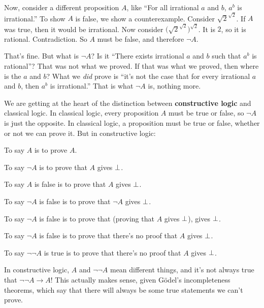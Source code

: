\documentclass[11pt,paper=letter]{scrartcl}
\renewcommand{\lnot}{\neg}
\begin{document}
Now, consider a different proposition $A$, like ``For all irrational $a$ and $b$, $a^b$ is irrational.'' To show $A$ is false, we show a counterexample. Consider $\sqrt{2}^{\sqrt{2}}$. If $A$ was true, then it would be irrational. Now consider $\Big(\sqrt{2}^{\sqrt{2}}\Big)^{\sqrt{2}}$. It is $2$, so it is rational. Contradiction. So $A$ must be false, and therefore $\lnot A$.

That's fine. But what is $\lnot A$? Is it ``There exists irrational $a$ and $b$ such that $a^b$ is rational''? That was not what we proved. If that was what we proved, then where is the $a$ and $b$? What we \emph{did} prove is ``it's not the case that for every irrational $a$ and $b$, then $a^b$ is irrational.'' That is what $\lnot A$ is, nothing more.



We are getting at the heart of the distinction between \textbf{constructive logic} and classical logic. In classical logic, every proposition $A$ must be true or false, so $\lnot A$ is just the opposite. In classical logic, a proposition must be true or false, whether or not we can prove it. But in constructive logic:
\begin{itemthin}
\item To say $A$ is to prove $A$.
\item To say $\lnot A$ is to prove that $A$ gives $\bot$.
\item To say $A$ is false is to prove that $A$ gives $\bot$.
\item To say $\lnot A$ is false is to prove that $\lnot A$ gives $\bot$.
\item To say $\lnot A$ is false is to prove that (proving that $A$ gives $\bot$), gives $\bot$.
\item To say $\lnot A$ is false is to prove that there's no proof that $A$ gives $\bot$.
\item To say $\lnot \lnot A$ is true is to prove that there's no proof that $A$ gives $\bot$.
\end{itemthin}
In constructive logic, $A$ and $\lnot\lnot A$ mean different things, and it's not always true that $\lnot\lnot A \to A$! This actually makes sense, given Gödel's incompleteness theorems, which say that there will always be some true statements we can't prove.
\end{document}
